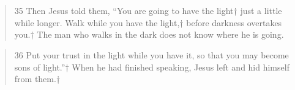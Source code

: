 \documentclass[11pt,a4paper]{scrartcl} %
\begin{document}
\clearpage
\begin{center}
\textcolor{Maroon}{}\\
\textcolor{brown}{}\\
\end{center}
\begin{verse}
35 Then Jesus told them, “You are going to have the light† just a little while longer. Walk while you have the light,† before darkness overtakes you.† The man who walks in the dark does not know where he is going.
\end{verse}
\begin{verse}
 36 Put your trust in the light while you have it, so that you may become sons of light.”† When he had finished speaking, Jesus left and hid himself from them.† 
\end{verse}
\end{document}
